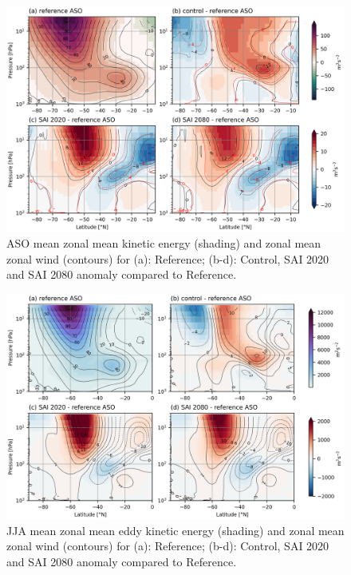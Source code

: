 \begin{figure}[H]
	\centering
	\includegraphics[width=0.95\linewidth]{images/PNJ_UT_U_zmdiff.png}
	\caption{ASO mean zonal mean kinetic energy (shading) and zonal mean zonal wind (contours) for (a): Reference; (b-d): Control, SAI 2020 and SAI 2080 anomaly compared to Reference.}
	\label{fig:PNJ_UT_U_zmdiff}
\end{figure}

\begin{figure}[H]
	\centering
	\includegraphics[width=0.95\linewidth]{images/PNJ_KE_U_zmdiff.png}
	\caption{JJA mean zonal mean eddy kinetic energy (shading) and zonal mean zonal wind (contours) for (a): Reference; (b-d): Control, SAI 2020 and SAI 2080 anomaly compared to Reference.}
	\label{fig:PNJ_KE_U_zmdiff}
\end{figure}


